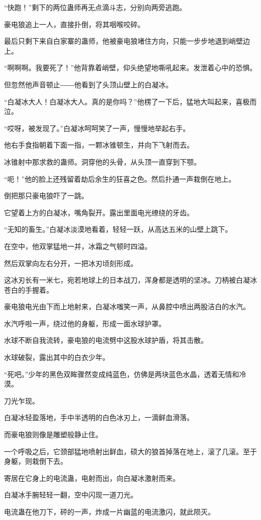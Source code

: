 \begin{this_body}
“快跑！”剩下的两位蛊师再无点滴斗志，分别向两旁逃跑。

豪电狼追上一人，直接扑倒，将其咽喉咬碎。

最后只剩下来自白家寨的蛊师，他被豪电狼堵住方向，只能一步步地退到峭壁边上。

“啊啊啊。我要死了！”他背靠着峭壁，仰头绝望地嘶吼起来。发泄着心中的恐惧。

但忽然他声音顿止――他看到了头顶山壁上的白凝冰。

“白凝冰大人！白凝冰大人。真的是你吗？”他楞了一下后，猛地大叫起来，喜极而泣。

“哎呀，被发现了。”白凝冰呵呵笑了一声，慢慢地举起右手。

他右手食指朝着下面一指，一颗冰锥顿生，并向下飞射而去。

冰锥射中那求救的蛊师。洞穿他的头骨，从头顶一直穿到下颚。

“呃！”他的脸上还残留着劫后余生的狂喜之色。然后扑通一声栽倒在地上。

倒把那只豪电狼吓了一跳。

它望着上方的白凝冰，嘴角裂开。露出里面电光缭绕的牙齿。

“无知的畜生。”白凝冰淡漠地看着，轻轻一跃，从高达五米的山壁上跳下。

在空中，他双掌猛地一并，冰霜之气顿时四溢。

然后双掌向左右分开，一把冰刃顷刻形成。

这冰刃长有一米七，宛若地球上的日本战刀，浑身都是透明的坚冰。刀柄被白凝冰苍白的手握着。

豪电狼电光由下而上地射来，白凝冰嗤笑一声，从鼻腔中喷出两股洁白的水汽。

水汽呼啦一声，绕过他的身躯，形成一面水球护罩。

水球不断自我流转，豪电狼的电流劈中这股水球护盾，将其击散。

水球破裂，露出其中的白衣少年。

“死吧。”少年的黑色双眸骤然变成纯蓝色，仿佛是两块蓝色水晶，透着无情和冷漠。

刀光乍现。

白凝冰轻盈落地，手中半透明的白色冰刃上，一滴鲜血滑落。

而豪电狼则像是雕塑般静止住。

一个呼吸之后，它颈部猛地喷射出鲜血，硕大的狼首掉落在地上，滚了几滚。至于身躯，则栽倒下去。

寄居在它身上的电流蛊，电射而出，向白凝冰激射而来。

白凝冰手腕轻轻一翻，空中闪现一道刀光。

电流蛊在他刀下，砰的一声，炸成一片幽蓝的电流激闪，就此陨灭。


\end{this_body}

